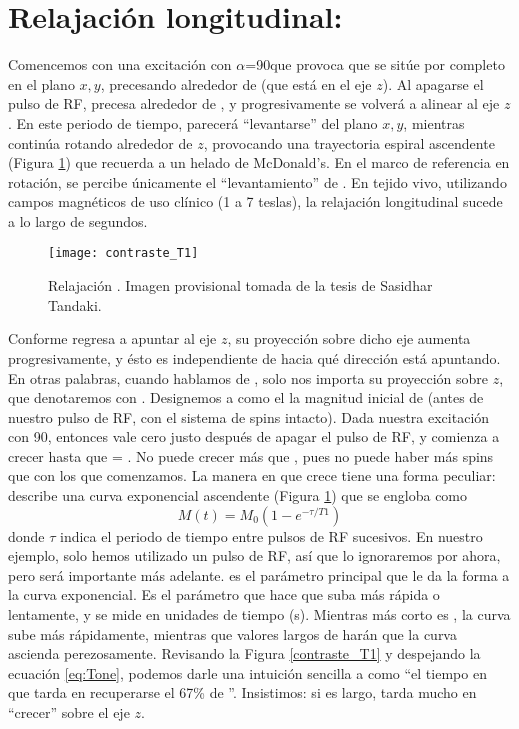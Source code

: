 \section{Relajación longitudinal: \Tone}
Comencemos con una excitación con $\alpha$=90\degrees que provoca que \M se 
sitúe por completo en el plano $x,y$, precesando alrededor de \Bzero (que está 
en el eje $z$). Al apagarse el pulso de RF, \M precesa alrededor de \Bzero, y 
 progresivamente se volverá a alinear al eje $z$. En este periodo de tiempo, \M 
parecerá ``levantarse'' del plano $x,y$, mientras continúa rotando alrededor de $z$, provocando una trayectoria espiral ascendente (Figura \ref{fig:T1}) que recuerda a un helado de McDonald's. En el marco de referencia en rotación, se percibe únicamente el ``levantamiento'' de \M. En tejido vivo, utilizando campos magnéticos de uso clínico (1 a 7 teslas), la relajación longitudinal \Tone sucede a lo largo de segundos. 


\begin{figure}[htb]
\begin{figg}
   \texttt{[image: contraste\_T1]}
   \caption{Relajación \Tone. Imagen provisional tomada de la tesis de Sasidhar Tandaki. \citep{tadanki2018}}
 \label{fig:T1}
 \end{figg}
\end{figure}



Conforme \M regresa a apuntar al eje $z$, su proyección sobre dicho eje aumenta progresivamente, y ésto es independiente de hacia qué dirección está apuntando. En otras palabras, cuando hablamos de \Tone, solo nos importa su proyección sobre $z$, que denotaremos con \Mz. Designemos a \Mzero como el la magnitud inicial de \M (antes de nuestro pulso de RF, con el sistema de spins intacto). Dada nuestra excitación con 90\degrees, entonces \Mz vale cero justo después de apagar el pulso de RF, y comienza a crecer hasta que \Mz = \Mzero. No puede crecer más que \Mzero, pues no puede haber más spins que con los que comenzamos. La manera en que \Mz crece tiene una forma peculiar: describe una curva exponencial ascendente (Figura \ref{fig:T1}) que se engloba como
\begin{equation}
\label{eq:Tone}
 M(t) = M_0(1 - e^{-\tau/T1})
\end{equation}
donde $\tau$ indica el periodo de tiempo entre pulsos de RF sucesivos. En nuestro ejemplo, solo hemos utilizado un pulso de RF, así que lo ignoraremos por ahora, pero será importante más adelante.  \Tone es el parámetro principal que le da la forma a la curva exponencial. Es el parámetro que hace que suba más rápida o lentamente, y se mide en unidades de tiempo (s). Mientras más corto es \Tone, la curva sube más rápidamente, mientras que valores largos de \Tone harán que la curva ascienda perezosamente. Revisando la Figura \ref{contraste_T1} y despejando la ecuación \ref{eq:Tone},  podemos darle una intuición sencilla a \Tone como ``el tiempo en que tarda en recuperarse el 67\% de \Mzero''. Insistimos: si \Tone es largo, \Mz tarda mucho en ``crecer'' sobre el eje $z$. 

